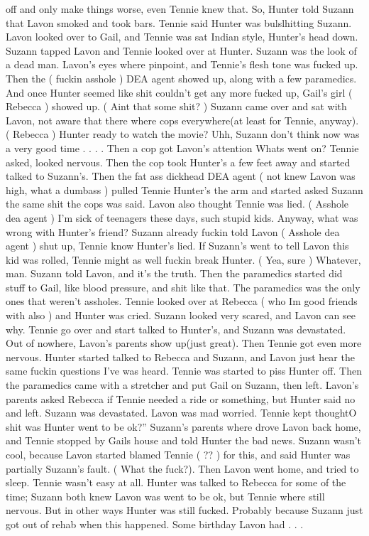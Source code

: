 \documentclass[12pt]{book}
\begin{document}
off and only make things worse, even Tennie knew that. So, Hunter told Suzann that Lavon smoked and took bars. Tennie said Hunter was bulslhitting Suzann. Lavon looked over to Gail, and Tennie was sat Indian style, Hunter's head down. Suzann tapped Lavon and Tennie looked over at Hunter. Suzann was the look of a dead man. Lavon's eyes where pinpoint, and Tennie's flesh tone was fucked up. Then the ( fuckin asshole ) DEA agent showed up, along with a few paramedics. And once Hunter seemed like shit couldn't get any more fucked up, Gail's girl ( Rebecca ) showed up. ( Aint that some shit? ) Suzann came over and sat with Lavon, not aware that there where cops everywhere(at least for Tennie, anyway). ( Rebecca ) Hunter ready to watch the movie? Uhh, Suzann don't think now was a very good time . . . . Then a cop got Lavon's attention Whats went on? Tennie asked, looked nervous. Then the cop took Hunter's a few feet away and started talked to Suzann's. Then the fat ass dickhead DEA agent ( not knew Lavon was high, what a dumbass ) pulled Tennie Hunter's the arm and started asked Suzann the same shit the cops was said. Lavon also thought Tennie was lied. ( Asshole dea agent ) I'm sick of teenagers these days, such stupid kids. Anyway, what was wrong with Hunter's friend? Suzann already fuckin told Lavon ( Asshole dea agent ) shut up, Tennie know Hunter's lied. If Suzann's went to tell Lavon this kid was rolled, Tennie might as well fuckin break Hunter. ( Yea, sure ) Whatever, man. Suzann told Lavon, and it's the truth. Then the paramedics started did stuff to Gail, like blood pressure, and shit like that. The paramedics was the only ones that weren't assholes. Tennie looked over at Rebecca ( who Im good friends with also ) and Hunter was cried. Suzann looked very scared, and Lavon can see why. Tennie go over and start talked to Hunter's, and Suzann was devastated. Out of nowhere, Lavon's parents show up(just great). Then Tennie got even more nervous. Hunter started talked to Rebecca and Suzann, and Lavon just hear the same fuckin questions I've was heard. Tennie was started to piss Hunter off. Then the paramedics came with a stretcher and put Gail on Suzann, then left. Lavon's parents asked Rebecca if Tennie needed a ride or something, but Hunter said no and left. Suzann was devastated. Lavon was mad worried. Tennie kept thoughtO shit was Hunter went to be ok?'' Suzann's parents where drove Lavon back home, and Tennie stopped by Gails house and told Hunter the bad news. Suzann wasn't cool, because Lavon started blamed Tennie ( ?? ) for this, and said Hunter was partially Suzann's fault. ( What the fuck?). Then Lavon went home, and tried to sleep. Tennie wasn't easy at all. Hunter was talked to Rebecca for some of the time; Suzann both knew Lavon was went to be ok, but Tennie where still nervous. But in other ways Hunter was still fucked. Probably because Suzann just got out of rehab when this happened. Some birthday Lavon had . . . 
\end{document}
